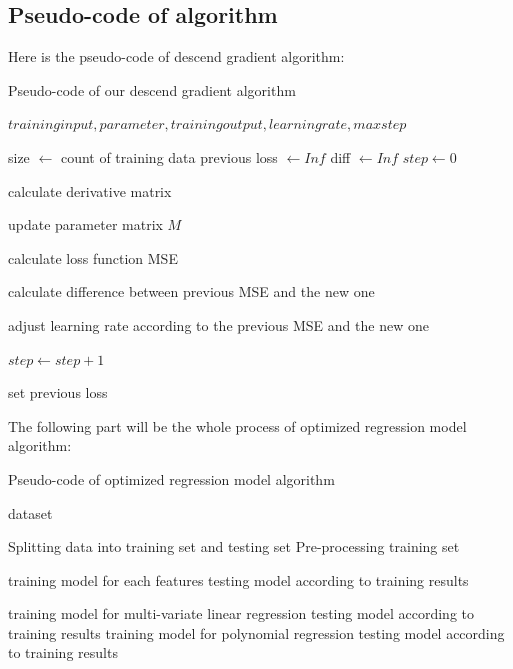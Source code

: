 \documentclass{article}
\begin{document}
\subsection{Pseudo-code of algorithm}
Here is the pseudo-code of descend gradient algorithm:
\begin{algorithm}
\caption{Pseudo-code of our descend gradient algorithm}\label{alg:cap}
\begin{algorithmic}
\Require $training input, parameter, training output, learning rate, max step$

\State size $ \gets $ count of training data
\State previous loss $\gets Inf$
\State diff $ \gets Inf$
\State $step \gets 0 $


\State calculate derivative matrix

\State update parameter matrix $M$

\State calculate loss function MSE

\State calculate difference between previous MSE and the new one

\State adjust learning rate according to the previous MSE and the new one

\State $step \gets step + 1 $

\State set previous loss

\EndWhile
\end{algorithmic}
\end{algorithm}


The following part will be the whole process of optimized regression model algorithm:

\begin{algorithm}
\caption{Pseudo-code of optimized regression model algorithm}\label{alg:cap}
\begin{algorithmic}
\Require dataset

\State Splitting data into training set and testing set
\State Pre-processing training set


    \State training model for each features
    \State testing model according to training results
    
    \State training model for multi-variate linear regression
    \State testing model according to training results
    \State training model for polynomial regression
    \State testing model according to training results
\EndIf

\end{algorithmic}
\end{algorithm}
\end{document}
